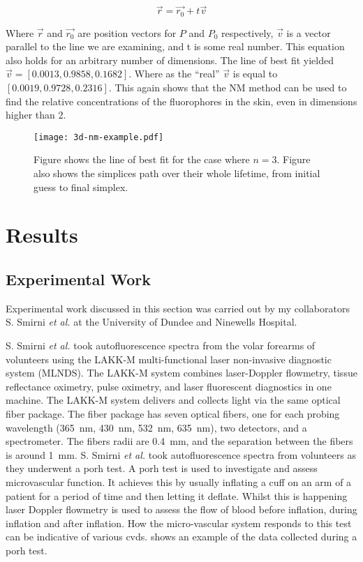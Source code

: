 \begin{equation}
\overrightarrow{r}=\overrightarrow{r_0}+t\overrightarrow{v}
\label{eqn:3dlineeqn}
\end{equation}

Where $\overrightarrow{r}$ and $\overrightarrow{r_0}$ are position vectors for $P$ and $P_0$ respectively, $\overrightarrow{v}$ is a vector parallel to the line we are examining, and t is some real number.
This equation also holds for an arbitrary number of dimensions.
The line of best fit yielded $\overrightarrow{v} =\left[0.0013, 0.9858, 0.1682\right]$.
Where as the ``real'' $\overrightarrow{v}$ is equal to $\left[0.0019, 0.9728, 0.2316\right]$.
This again shows that the NM method can be used to find the relative concentrations of the fluorophores in the skin, even in dimensions higher than 2.

\begin{figure}[!htpb]
  \centering
  \texttt{[image: 3d-nm-example.pdf]}
  \caption{Figure shows the line of best fit for the case where $n=3$. Figure also shows the simplices path over their whole lifetime, from initial guess to final simplex.}
  \label{fig:3dtoymodel}
\end{figure}

\FloatBarrier
\section{Results}

\subsection{Experimental Work}

Experimental work discussed in this section was carried out by my collaborators S. Smirni \textit{et al.} at the University of Dundee and Ninewells Hospital.

S. Smirni \textit{et al.} took autofluorescence spectra from the volar forearms of volunteers using the LAKK-M multi-functional laser non-invasive diagnostic system (MLNDS)\@.
The LAKK-M system combines laser-Doppler flowmetry, tissue reflectance oximetry, pulse oximetry, and laser fluorescent diagnostics in one machine.
The LAKK-M system delivers and collects light via the same optical fiber package.
The fiber package has seven optical fibers, one for each probing wavelength (365~nm, 430~nm, 532~nm, 635~nm), two detectors, and a spectrometer.
The fibers radii are 0.4~mm, and the separation between the fibers is around 1~mm.
S. Smirni \textit{et al.} took autofluorescence spectra from volunteers as they underwent a \gls*{porh} test.
A \gls*{porh} test is used to investigate and assess microvascular function.
It achieves this by usually inflating a cuff on an arm of a patient for a period of time and then letting it deflate.
Whilst this is happening laser Doppler flowmetry is used to assess the flow of blood before inflation, during inflation and after inflation.
How the micro-vascular system responds to this test can be indicative of various \gls*{cvds}.
 shows an example of the data collected during a \gls*{porh} test.



